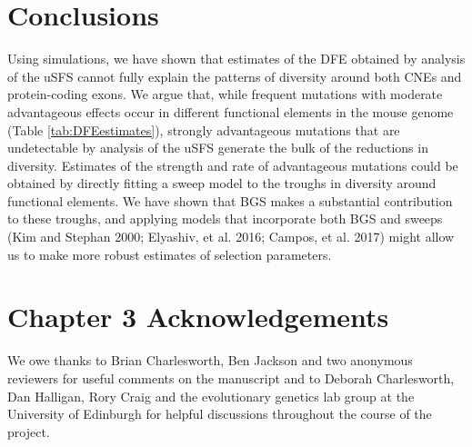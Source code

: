 \section{Conclusions}

	Using simulations, we have shown that estimates of the DFE obtained by analysis of the uSFS cannot fully explain the patterns of diversity around both CNEs and protein-coding exons. We argue that, while frequent mutations with moderate advantageous effects occur in different functional elements in the mouse genome (Table \ref{tab:DFEestimates}), strongly advantageous mutations that are undetectable by analysis of the uSFS generate the bulk of the reductions in diversity. Estimates of the strength and rate of advantageous mutations could be obtained by directly fitting a sweep model to the troughs in diversity around functional elements. We have shown that BGS makes a substantial contribution to these troughs, and applying models that incorporate both BGS and sweeps (Kim and Stephan 2000; Elyashiv, et al. 2016; Campos, et al. 2017) might allow us to make more robust estimates of selection parameters. 


\section{Chapter 3 Acknowledgements}
 
We owe thanks to Brian Charlesworth, Ben Jackson and two anonymous reviewers for useful comments on the manuscript and to Deborah Charlesworth, Dan Halligan, Rory Craig and the evolutionary genetics lab group at the University of Edinburgh for helpful discussions throughout the course of the project.

